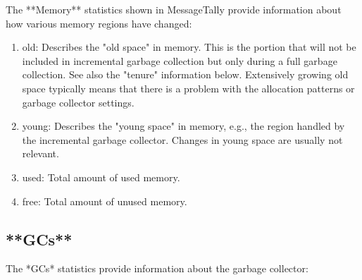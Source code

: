 \documentclass[a4paper,10pt,twoside]{book}
\begin{document}
The **Memory** statistics shown in MessageTally provide information
about how various memory regions have changed:

\begin{enumerate}
\item old: Describes the "old space" in memory. This is the portion that
will not be included in incremental garbage collection but only during a
full garbage collection. See also the "tenure" information below.
Extensively growing old space typically means that there is a problem
with the allocation patterns or garbage collector settings.

\item young: Describes the "young space" in memory, e.g., the region handled
by the incremental garbage collector. Changes in young space are usually
not relevant.

\item used: Total amount of used memory.

\item free: Total amount of unused memory.
\end{enumerate}

\subsection{**GCs**}

The *GCs* statistics provide information about the garbage collector:
\end{document}
